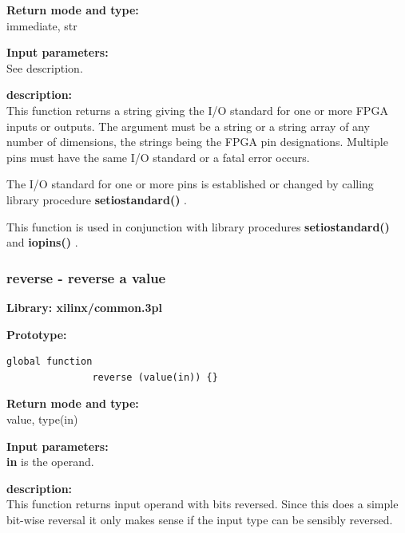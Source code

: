             {\bf Return mode and type:} \\
            immediate, str

            {\bf Input parameters:} \\            
            See description.

            {\bf description:} \\
            This function returns a string giving the I/O standard for one
            or more FPGA inputs or outputs. The argument must be a string or a string array of any
            number of dimensions, the strings being the FPGA pin designations.
            Multiple pins must have the same I/O standard or a fatal error occurs.
            
            The I/O standard for one or more pins is established or changed by calling
            library procedure {\bf setiostandard()} .
            
            This function is used in conjunction with library procedures {\bf
            setiostandard()}  and {\bf iopins()}
            .





        \subsubsection{reverse - reverse a value}\label{sec:lfreverse}
            
            {\bf Library: xilinx/common.3pl}

            {\bf Prototype:} \\
            \vsp
            \begin{lstlisting}[gobble=12, language=threepl]
               global function
               reverse (value(in)) {}
            \end{lstlisting}

            {\bf Return mode and type:} \\
            value, type(in)

            {\bf Input parameters:} \\            
            {\bf in} is the operand.

            {\bf description:} \\
            This function returns input operand with bits reversed. Since this
            does a simple bit-wise reversal it only makes sense if the input
            type can be sensibly reversed.
           




